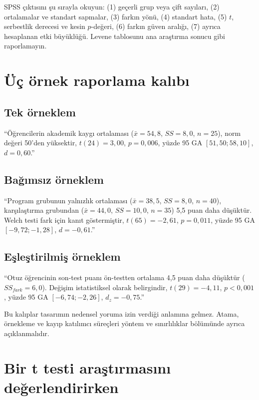 \begin{outputguidebox}
SPSS çıktısını şu sırayla okuyun: (1) geçerli grup veya çift sayıları, (2)
ortalamalar ve standart sapmalar, (3) farkın yönü, (4) standart hata, (5)
$t$, serbestlik derecesi ve kesin $p$-değeri, (6) farkın güven aralığı, (7)
ayrıca hesaplanan etki büyüklüğü. Levene tablosunu ana araştırma sonucu gibi
raporlamayın.
\end{outputguidebox}

\section{Üç örnek raporlama kalıbı}

\subsection*{Tek örneklem}

``Öğrencilerin akademik kaygı ortalaması ($\bar x=54{,}8$, $SS=8{,}0$,
$n=25$), norm değeri 50'den yüksektir, $t(24)=3{,}00$, $p=0{,}006$,
yüzde 95 GA $[51{,}50;58{,}10]$, $d=0{,}60$.''

\subsection*{Bağımsız örneklem}

``Program grubunun yalnızlık ortalaması ($\bar x=38{,}5$, $SS=8{,}0$,
$n=40$), karşılaştırma grubundan ($\bar x=44{,}0$, $SS=10{,}0$, $n=35$)
5,5 puan daha düşüktür. Welch testi fark için kanıt göstermiştir,
$t(65)=-2{,}61$, $p=0{,}011$, yüzde 95 GA $[-9{,}72;-1{,}28]$,
$d=-0{,}61$.''

\subsection*{Eşleştirilmiş örneklem}

``Otuz öğrencinin son-test puanı ön-testten ortalama 4,5 puan daha düşüktür
($SS_{fark}=6{,}0$). Değişim istatistiksel olarak belirgindir,
$t(29)=-4{,}11$, $p<0{,}001$, yüzde 95 GA $[-6{,}74;-2{,}26]$,
$d_z=-0{,}75$.''

Bu kalıplar tasarımın nedensel yoruma izin verdiği anlamına gelmez. Atama,
örnekleme ve kayıp katılımcı süreçleri yöntem ve sınırlılıklar bölümünde
ayrıca açıklanmalıdır.

\section{Bir t testi araştırmasını değerlendirirken}

